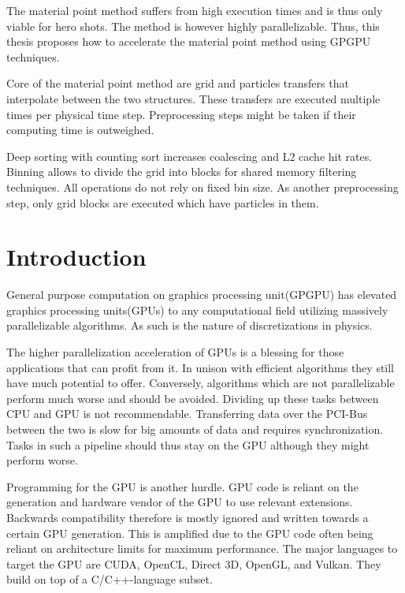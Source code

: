 \documentclass[m,times]{cgMA}
\begin{document}
\noindent The material point method suffers from high execution times and is thus only viable for hero shots. The method is however highly parallelizable. Thus, this thesis proposes how to accelerate the material point method using GPGPU techniques.

\noindent Core of the material point method are grid and particles transfers that interpolate between the two structures. These transfers are executed multiple times per physical time step. Preprocessing steps might be taken if their computing time is outweighed.

\noindent Deep sorting with counting sort increases coalescing and L2 cache hit rates. Binning allows to divide the grid into blocks for shared memory filtering techniques. All operations do not rely on fixed bin size. As another preprocessing step, only grid blocks are executed which have particles in them.
\vfill
\clearpage
\tableofcontents

\clearpage         %
{}

\section{Introduction} \label{intro}
General purpose computation on graphics processing unit(GPGPU) has elevated graphics processing units(GPUs) to any computational field utilizing massively parallelizable algorithms. As such is the nature of discretizations in physics.

The higher parallelization acceleration of GPUs is a blessing for those applications that can profit from it. In unison with efficient algorithms they still have much potential to offer. Conversely, algorithms which are not parallelizable perform much worse and should be avoided. Dividing up these tasks between CPU and GPU is not recommendable. Transferring data over the PCI-Bus between the two is slow for big amounts of data and requires synchronization. Tasks in such a pipeline should thus stay on the GPU although they might perform worse.

Programming for the GPU is another hurdle. GPU code is reliant on the generation and hardware vendor of the GPU to use relevant extensions. Backwards compatibility therefore is mostly ignored and written towards a certain GPU generation. This is amplified due to the GPU code often being reliant on architecture limits for maximum performance. The major languages to target the GPU are CUDA, OpenCL, Direct 3D, OpenGL, and Vulkan. They build on top of a C/C++-language subset.
\end{document}
